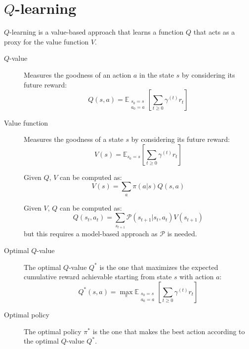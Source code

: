 \section{$Q$-learning}

$Q$-learning is a value-based approach that learns a function $Q$ that acts as a proxy for the value function $V$.

\begin{description}
    \item[$Q$-value] 
        Measures the goodness of an action $a$ in the state $s$ by considering its future reward:
        \[ Q(s, a) = \mathbb{E}_{\substack{s_0 = s\\a_0 = a}} \left[ \sum_{t \geq 0} \gamma^{(t)} r_t \right] \]

    \item[Value function] 
        Measures the goodness of a state $s$ by considering its future reward:
        \[ V(s) = \mathbb{E}_{s_0 = s} \left[ \sum_{t \geq 0} \gamma^{(t)} r_t \right] \]

        Given $Q$, $V$ can be computed as:
        \[ V(s) = \sum_{a} \pi(a | s) Q (s, a) \]

        \begin{remark}
            Given $V$, $Q$ can be computed as:
            \[ Q(s_t, a_t) = \sum_{s_{t+1}} \mathcal{P}(s_{t+1} | s_t, a_t) V(s_{t+1}) \]
            but this requires a model-based approach as $\mathcal{P}$ is needed.
        \end{remark}

    \item[Optimal $Q$-value] 
        The optimal $Q$-value $Q^*$ is the one that maximizes the expected cumulative reward 
        achievable starting from state $s$ with action $a$:
        \[ Q^*(s, a) = \max_\pi \mathbb{E}_{\substack{s_0 = s\\a_0 = a}} \left[ \sum_{t \geq 0} \gamma^{(t)} r_t \right] \]

    \item[Optimal policy] 
        The optimal policy $\pi^*$ is the one that makes the best action according to the optimal $Q$-value $Q^*$.
\end{description}


